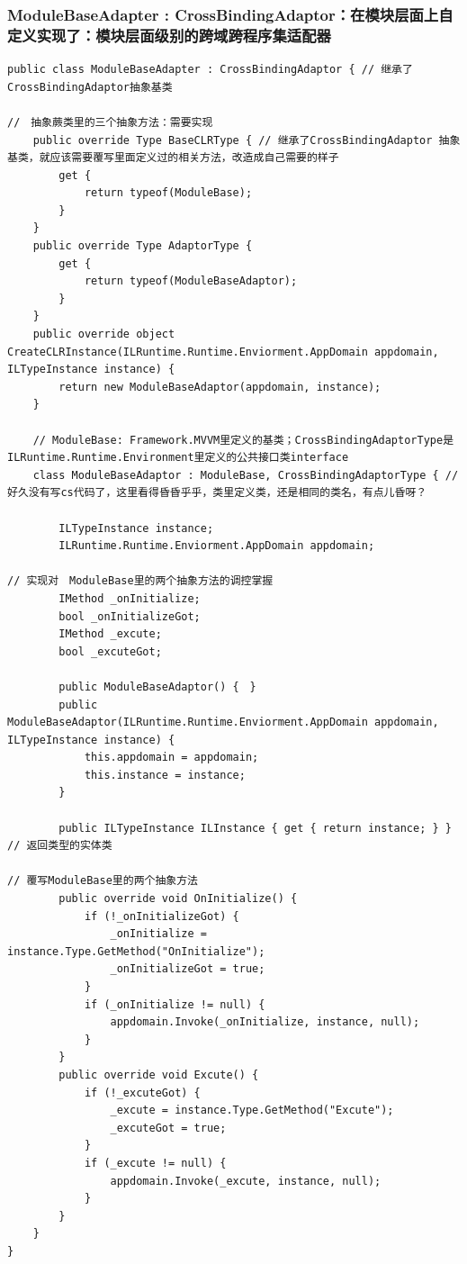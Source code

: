 \documentclass[9pt, b5paper]{article}
\begin{document}
\subsubsection{ModuleBaseAdapter : CrossBindingAdaptor：在模块层面上自定义实现了：模块层面级别的跨域跨程序集适配器}
\label{sec-6-3-2}
\begin{verbatim}
public class ModuleBaseAdapter : CrossBindingAdaptor { // 继承了CrossBindingAdaptor抽象基类

//　抽象蕨类里的三个抽象方法：需要实现　
    public override Type BaseCLRType { // 继承了CrossBindingAdaptor 抽象基类，就应该需要覆写里面定义过的相关方法，改造成自己需要的样子
        get {
            return typeof(ModuleBase);
        }
    }
    public override Type AdaptorType {
        get {
            return typeof(ModuleBaseAdaptor);
        }
    }
    public override object CreateCLRInstance(ILRuntime.Runtime.Enviorment.AppDomain appdomain, ILTypeInstance instance) {
        return new ModuleBaseAdaptor(appdomain, instance);
    }

    // ModuleBase: Framework.MVVM里定义的基类；CrossBindingAdaptorType是ILRuntime.Runtime.Environment里定义的公共接口类interface
    class ModuleBaseAdaptor : ModuleBase, CrossBindingAdaptorType { // 好久没有写cs代码了，这里看得昏昏乎乎，类里定义类，还是相同的类名，有点儿昏呀？

        ILTypeInstance instance;
        ILRuntime.Runtime.Enviorment.AppDomain appdomain;

// 实现对　ModuleBase里的两个抽象方法的调控掌握
        IMethod _onInitialize;
        bool _onInitializeGot;
        IMethod _excute;
        bool _excuteGot;
        
        public ModuleBaseAdaptor() {　}
        public ModuleBaseAdaptor(ILRuntime.Runtime.Enviorment.AppDomain appdomain, ILTypeInstance instance) {
            this.appdomain = appdomain; 
            this.instance = instance;
        }
        
        public ILTypeInstance ILInstance { get { return instance; } } // 返回类型的实体类

// 覆写ModuleBase里的两个抽象方法
        public override void OnInitialize() {
            if (!_onInitializeGot) {
                _onInitialize = instance.Type.GetMethod("OnInitialize");
                _onInitializeGot = true;
            }
            if (_onInitialize != null) {
                appdomain.Invoke(_onInitialize, instance, null);
            }
        }
        public override void Excute() {
            if (!_excuteGot) {
                _excute = instance.Type.GetMethod("Excute");
                _excuteGot = true;
            }
            if (_excute != null) {
                appdomain.Invoke(_excute, instance, null);
            }
        }
    }
}
\end{verbatim}
\end{document}
